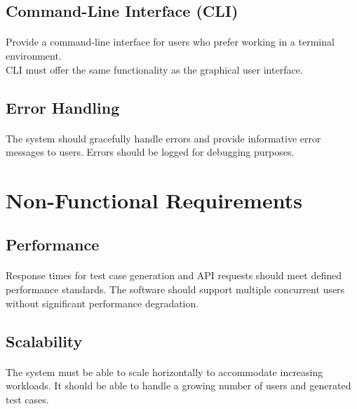 \documentclass{article}
\begin{document}
\subsection{Command-Line Interface (CLI)}
\paragraph{}
Provide a command-line interface for users who prefer working in a terminal environment.\\
CLI must offer the same functionality as the graphical user interface.

\subsection{Error Handling}
\paragraph{}
The system should gracefully handle errors and provide informative error messages to users.
Errors should be logged for debugging purposes.


\section{Non-Functional Requirements}
\subsection{Performance}
\paragraph{}
Response times for test case generation and API requests should meet defined performance
standards. The software should support multiple concurrent users without significant
performance degradation.

\subsection{Scalability}
\paragraph{}
The system must be able to scale horizontally to accommodate increasing workloads.
It should be able to handle a growing number of users and generated test cases.
\end{document}
